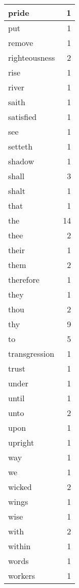 \begin{center}
\begin{longtable}{l|r}
pride & 1 \\ \hline
put & 1 \\ \hline
remove & 1 \\ \hline
righteousness & 2 \\ \hline
rise & 1 \\ \hline
river & 1 \\ \hline
saith & 1 \\ \hline
satisfied & 1 \\ \hline
see & 1 \\ \hline
setteth & 1 \\ \hline
shadow & 1 \\ \hline
shall & 3 \\ \hline
shalt & 1 \\ \hline
that & 1 \\ \hline
the & 14 \\ \hline
thee & 2 \\ \hline
their & 1 \\ \hline
them & 2 \\ \hline
therefore & 1 \\ \hline
they & 1 \\ \hline
thou & 2 \\ \hline
thy & 9 \\ \hline
to & 5 \\ \hline
transgression & 1 \\ \hline
trust & 1 \\ \hline
under & 1 \\ \hline
until & 1 \\ \hline
unto & 2 \\ \hline
upon & 1 \\ \hline
upright & 1 \\ \hline
way & 1 \\ \hline
we & 1 \\ \hline
wicked & 2 \\ \hline
wings & 1 \\ \hline
wise & 1 \\ \hline
with & 2 \\ \hline
within & 1 \\ \hline
words & 1 \\ \hline
workers & 1 \\ \hline
\end{longtable}
\end{center}



\normalsize



